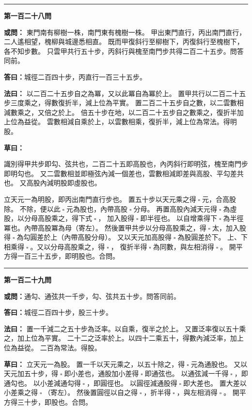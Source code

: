 \documentclass[11pt,a4paper]{article}
\let\origsquare\square
\renewcommand{\square}{\ensuremath{\origsquare}}%
\newcommand{\longline}{\noindent\rule{\textwidth}{0.4pt}}
\newcommand{\owen}[1]{%
  \par\vspace{0.4em}%
  \noindent\textcolor{problemcolor}{\textbf{或問：}}{\tradfont #1}\par\nopagebreak%
}
\newcommand{\fayue}[1]{%
  \par\noindent\textcolor{methodcolor}{\textbf{法曰：}}{\tradfont #1}\par\nopagebreak%
}
\newcommand{\tsaoyue}[1]{%
  \par\noindent\textcolor{workcolor}{\textbf{草曰：}}{\tradfont #1}\par%
}
\newcommand{\dayue}[1]{%
  \par\noindent\textcolor{anscolor}{\textbf{答曰：}}{\tradfont #1}\par\nopagebreak%
}
\newcommand{\wen}[1]{\par\vspace{0.3em}\noindent\textcolor{problemcolor}{\textbf{第#1問}}\par}
\begin{document}
\vspace{0.5cm}
\begin{center}
\longline
\end{center}

\wen{一百二十八}
\owen{%
東門南有柳樹一株，南門東有槐樹一株。
甲出東門直行，丙出南門直行，二人遙相望，槐柳與城邊悉相直。
既而甲復斜行至柳樹下，丙復斜行至槐樹下，各不知步數。
只雲甲共行五十步，丙斜行與槐至南門步共得二百二十五步。問答同前。}
\dayue{城徑二百四十步，丙直行一百三十五步。}

\fayue{%
以二百二十五步自之為冪，又以此冪自為冪於上。
置甲共行以二百二十五步三度乘之，得數復折半，減上位為平實。
置二百二十五步自之數，以二雲數相減數乘之，又倍之於上。
倍五十步在地，以二百二十五步自之數乘之，復折半加上位為益從。
雲數相減自乘於上，以雲數相乘，復折半，減上位為常法。得明股。}

\tsaoyue{%
識別得甲共步即勾、弦共也，二百二十五即高股也，內丙斜行即明弦，槐至南門步即明勾也。
又二雲數相並即極弦內減一個差也，雲數相減即差與高股、平勾差共也。
又高股內減明股即虛股也。

立天元一為明股，即丙出南門直行步也。
置五十步以天元乘之得$ \; \square \; $元，合高股除。
不除，便以此$ \; \square \; $元為股也，內帶高股$ \; \square \; $分母。
再置高股內減天元得$ \; \square \; $為虛股，以分母高股乘之，得下式$ \; \square \; $，
加入股得$ \; \square \; $即半徑也。
以自增乘得下$ \; \square \; $為半徑冪也。內帶高股冪為母（寄左）。
然後置甲共步以分母高股乘之，得$ \; \square \; $太，加入股得$ \; \square \; $為勾圓差於上（內帶高股分母）。
又以天元加高股得$ \; \square \; $為股圓差於下。
上、下相乘得$ \; \square \; $。又以分母高股乘之，得$ \; \square \; $，
復折半得$ \; \square \; $為同數，與左相消得$ \; \square \; $。
開平方得一百三十五步，即明股也。合問。}

\vspace{0.5cm}
\begin{center}
\longline
\end{center}

\wen{一百二十九}
\owen{通勾、通弦共一千步，勾、弦共五十步。問答同前。}
\dayue{城徑二百四十步，股三十步。}

\fayue{%
置一千減二之五十步為泛率。以自乘，復半之於上。
又置泛率復以五十乘之，加上位為平實。
二十二之泛率於上。以四十二乘五十，得數內減泛率，加上位為益從。
二百為常法。得股。}

\tsaoyue{%
立天元一為股。
置一千以天元乘之，以五十除之，得$ \; \square \; $元為通股也。
又以天元加五十步，得$ \; \square \; $即小差也，通股加小差得$ \; \square \; $即通弦也。
以通弦減一千得$ \; \square \; $，即通勾也。
以小差減通勾得$ \; \square \; $，即圓徑也。
以圓徑減通股得$ \; \square \; $即大差也。
置大差以小差乘之得$ \; \square \; $（寄左）。
然後置圓徑以自之得$ \; \square \; $，折半得$ \; \square \; $，與左相消得$ \; \square \; $。
開平方得三十步，即股也。合問。}
\end{document}
